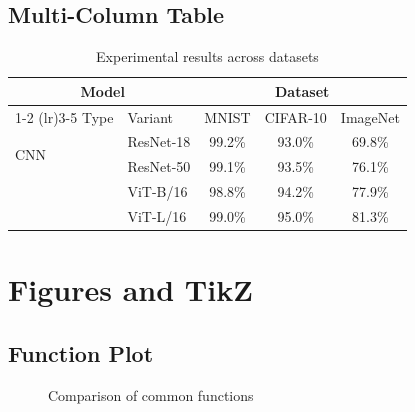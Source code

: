 \documentclass[11pt,a4paper]{article}
\begin{document}
\subsection{Multi-Column Table}
\begin{table}[htbp]
    \centering
    \caption{Experimental results across datasets}
    \label{tab:results}
    \begin{tabular}{@{}llccc@{}}
        \toprule
        \multicolumn{2}{c}{Model} & \multicolumn{3}{c}{Dataset} \\
        \cmidrule(lr){1-2} \cmidrule(lr){3-5}
        Type    & Variant  & MNIST & CIFAR-10 & ImageNet \\
        \midrule
        \multirow{2}{*}{CNN}
                & ResNet-18  & 99.2\% & 93.0\% & 69.8\% \\
                & ResNet-50  & 99.1\% & 93.5\% & 76.1\% \\
        \addlinespace
        \multirow{2}{*}{Transformer}
                & ViT-B/16   & 98.8\% & 94.2\% & 77.9\% \\
                & ViT-L/16   & 99.0\% & 95.0\% & 81.3\% \\
        \bottomrule
    \end{tabular}
\end{table}

\section{Figures and TikZ}

\subsection{Function Plot}
\begin{figure}[htbp]
    \centering
    \caption{Comparison of common functions}
    \label{fig:functions}
\end{figure}
\end{document}
